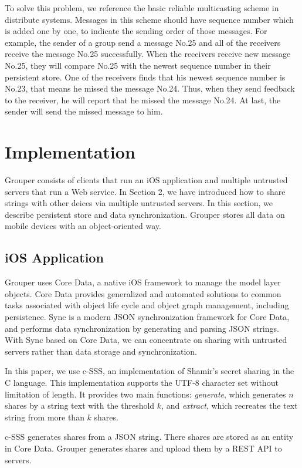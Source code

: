 \documentclass[twocolumn,10pt]{article}
\begin{document}
To solve this problem, we reference the basic reliable multicasting scheme in distribute systems. Messages in this scheme should have sequence number which is added one by one, to indicate the sending order of those messages. For example, the sender of a group send a message No.25 and all of the receivers receive the message No.25 successfully. When the receivers receive new message No.25, they will compare No.25 with the newest sequence number in their persistent store. One of the receivers finds that his newest sequence number is No.23, that means he missed the message No.24. Thus, when they send feedback to the receiver, he will report that he missed the message No.24. At last, the sender will send the missed message to him.

\section{Implementation}
Grouper consists of clients that run an iOS application and multiple untrusted servers that run a Web service. In Section 2, we have introduced how to share strings with other deices via multiple untrusted servers. In this section, we describe persistent store and data synchronization. Grouper stores all data on mobile devices with an object-oriented way.

\subsection{iOS Application}
 Grouper uses Core Data\cite{coredata}, a native iOS framework to manage the model layer objects. Core Data provides generalized and automated solutions to common tasks associated with object life cycle and object graph management, including persistence. Sync\cite{sync} is a modern JSON synchronization framework for Core Data, and performs data synchronization by generating and parsing JSON strings. With Sync based on Core Data, we can concentrate on sharing with untrusted servers rather than data storage and synchronization.

In this paper, we use c-SSS\cite{c-sss}, an implementation of Shamir's secret sharing in the C language. This implementation supports the UTF-8 character set without limitation of length. It provides two main functions: \emph{generate}, which generates $n$ shares by a string text with the threshold $k$, and \emph{extract}, which recreates the text string from more than $k$ shares. 

c-SSS generates shares from a JSON string. There shares are stored as an entity in Core Data. Grouper generates shares and upload them by a REST API to servers.
\end{document}

